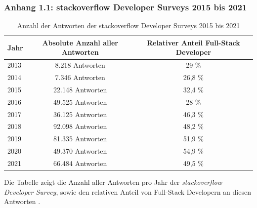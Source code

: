 \documentclass[a4paper]{scrartcl}
\begin{document}
\subsubsection*{Anhang 1.1: stackoverflow Developer Surveys 2015 bis 2021}

\begin{table}[H]
	\centering
	\caption{Anzahl der Antworten der stackoverflow Developer Surveys 2015 bis 2021}
	\begin{center}
		\begin{tabular}{| l | c | c |}
			\hline
			Jahr & Absolute Anzahl aller Antworten & Relativer Anteil Full-Stack Developer \\
			\hline \hline
			2013 & 8.218 Antworten & 29 \% \\
			\hline
			2014 & 7.346 Antworten & 26,8 \% \\
			\hline
			2015 & 22.148 Antworten & 32,4 \% \\
			\hline 
			2016 & 49.525 Antworten & 28 \% \\
			\hline 
			2017 & 36.125 Antworten & 46,3 \% \\
			\hline 
			2018 & 92.098 Antworten & 48,2 \% \\
			\hline
			2019 & 81.335 Antworten & 51,9 \% \\
			\hline
			2020 & 49.370 Antworten & 54,9 \% \\
			\hline
			2021 & 66.484 Antworten & 49,5 \% \\
			\hline
		\end{tabular}
	\end{center}
	Die Tabelle zeigt die Anzahl aller Antworten pro Jahr der \textit{stackoverflow Developer Survey}, sowie den relativen Anteil von Full-Stack Developern an diesen Antworten \autocite{stackoverflow_2015,stackoverflow_2016,stackoverflow_2017,stackoverflow_2018,stackoverflow_2019,stackoverflow_2020,stackoverflow_2021}.
\end{table}
\end{document}
